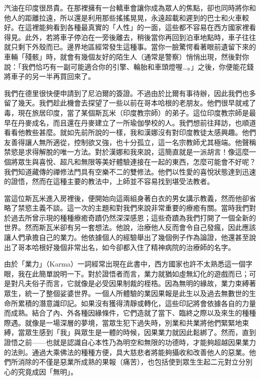 汽油在印度很昂貴。在那裡擁有一台轎車會讓你成為眾人的焦點，卻也同時將你和他人的距離拉遠，所以還是利用那些搖搖晃晃，永遠超載和遲到的巴士和火車較好。在這裡能夠看到各種最真實的「人性」的一面，這些都不容易在西方國家裡看得見。此外，若將車子停泊在一旁後離去，稍後當你再回到泊車地點時，車子往往就只剩下外殼而已。邊界地區經常發生這種事。當你一臉驚愕看著眼前遺留下來的車輛「殘骸」時，就會有幾個友好的陌生人（通常是警察）悄悄出現，然後對你說：「我們恰巧有一副可能適合你的引擎、輪胎和車頭燈喔\ldots{}。」之後，你便能花錢將車子的另一半再買回來了。

我們在德里很快便申請到了尼泊爾的簽證。不過由於比爾有事待辦，因此我們也多留了幾天。我們趁此機會去探望了一些以前在哥本哈根的老朋友。他們很早就戒了毒，現在旅居印度，當了某個斯瓦米（印度教宗師）的弟子。這位印度教宗師是最早在丹麥成名，而且還在丹麥建立了一所瑜伽學校的人。我們想前往拜訪，也順道看看他教些甚麼。就如先前所說的一樣，我和漢娜沒有對印度教徒太感興趣。他們友善得讓人無所適從，控制欲又強，也十分孤立，這一名宗教師尤其極端。他聲稱禁慾是求得解脫的唯一方法。對於漢娜和我來說，這簡直就是一派胡言！像這麼一個將眾生與喜悅、超凡和無限等美好體驗連接在一起的東西，怎麼可能會不好呢？我們知道藏傳的禪修法門具有空樂不二的雙修法。他們以性愛的喜悅狀態達到迅速的證悟，然而在這種主要的教法中，上師並不容易找到堪受法教者。

當這位斯瓦米進入房裡後，便開始向這兩組身著白衣的男女講示教義，然而他卻省略了禁慾主義不談。這一次的主題和對我們來說非常重要的療癒有關。當時我們對於過去所曾示現的種種療癒奇蹟仍然深深感恩；這些奇蹟為我們打開了一個全新的世界。然而斯瓦米卻有另一套想法。他說，治療他人反而會令自己發瘋，因此應該讓人們承擔自己的業力。他依據個人的經驗舉出了幾個例子作為論證，他還甚至說出了哥本哈根好幾個非常出名，如今卻都入住了精神病院的治療師的名字。

由於「業力」（Karma）一詞經常出現在此書中，西方國家也許不太熟悉這一個字眼，我在此簡單說明一下。對於證悟者而言，業力就猶如虛無幻化的遊戲而已；可是對凡夫俗子而言，它就像是必受因果制裁的桎梏。因為無明的緣故，業力束縛著眾生，統一了整個娑婆世界。一個人所體驗的業因果報是此生以及過去無數世的生命所累積的潛意識印記。如果沒有獲得清靜或轉化，這些印記將會依據各自的力量而成熟。結合了內、外各種因緣條件，它們造就了當下、臨終之際以及來生的種種際遇。就像是一場深層的夢境，當眾生犯下過失時，別業和共業將他們緊緊地束縛，當眾生感到「我」與眾生是一體的時候，因果業力就因此鬆綁了。然而，直到證悟之前——也就是認識自心本性乃為明空和無限的功德時，才能夠超越因果業力的法則。通過大乘佛法的種種方便，具大慈悲者將能夠攝收和改善他人的惡業。他們所消除的不僅是惡業所成熟的果報（痛苦），也包括使到眾生生起二元對立分別心的究竟成因「無明」。

